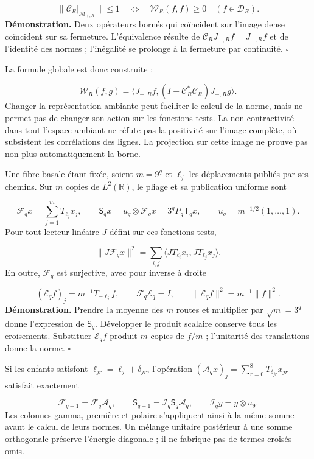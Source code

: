 \[
\|\mathcal C_R|_{\mathcal M_{+,R}}\|\leq1
\quad\Longleftrightarrow\quad
\mathscr W_R(f,f)\geq0\quad(f\in\mathcal D_R).
\]
\textbf{Démonstration.} Deux opérateurs bornés qui coïncident sur l’image dense coïncident sur sa fermeture. L’équivalence résulte de \(\mathcal C_RJ_{+,R}f=J_{-,R}f\) et de l’identité des normes ; l’inégalité se prolonge à la fermeture par continuité. \hfill\(\square\)

La formule globale est donc construite :

\[
\mathscr W_R(f,g)=
\langle J_{+,R}f,(I-\mathcal C_R^*\mathcal C_R)J_{+,R}g\rangle.
\]
Changer la représentation ambiante peut faciliter le calcul de la norme, mais ne permet pas de changer son action sur les fonctions tests. La non-contractivité dans tout l’espace ambiant ne réfute pas la positivité sur l’image complète, où subsistent les corrélations des lignes. La projection sur cette image ne prouve pas non plus automatiquement la borne.

Une fibre basale étant fixée, soient \(m=9^q\) et \(\ell_j\) les déplacements publiés par ses chemins. Sur \(m\) copies de \(L^2(\mathbb R)\), le pliage et sa publication uniforme sont

\[
\mathcal F_qx=\sum_{j=1}^mT_{\ell_j}x_j,\qquad
\mathsf S_qx=u_q\otimes\mathcal F_qx=3^qP_q\mathsf T_qx,
\qquad u_q=m^{-1/2}(1,\ldots,1).
\]
Pour tout lecteur linéaire \(J\) défini sur ces fonctions tests,

\[
\|J\mathcal F_qx\|^2
=\sum_{i,j}\langle JT_{\ell_i}x_i,JT_{\ell_j}x_j\rangle.
\]
En outre, \(\mathcal F_q\) est surjective, avec pour inverse à droite

\[
(\mathcal E_qf)_j=m^{-1}T_{-\ell_j}f,\qquad
\mathcal F_q\mathcal E_q=I,\qquad
\|\mathcal E_qf\|^2=m^{-1}\|f\|^2.
\]
\textbf{Démonstration.} Prendre la moyenne des \(m\) routes et multiplier par \(\sqrt m=3^q\) donne l’expression de \(\mathsf S_q\). Développer le produit scalaire conserve tous les croisements. Substituer \(\mathcal E_qf\) produit \(m\) copies de \(f/m\) ; l’unitarité des translations donne la norme. \hfill\(\square\)

Si les enfants satisfont \(\ell_{jr}=\ell_j+\delta_{jr}\), l'opération \((\mathcal A_qx)_j=\sum_{r=0}^8T_{\delta_{jr}}x_{jr}\) satisfait exactement

\[
\mathcal F_{q+1}=\mathcal F_q\mathcal A_q,\qquad
\mathsf S_{q+1}=\mathcal I_q\mathsf S_q\mathcal A_q,\qquad
\mathcal I_qy=y\otimes u_9.
\]
Les colonnes gamma, première et polaire s'appliquent ainsi à la même somme avant le calcul de leurs normes. Un mélange unitaire postérieur à une somme orthogonale préserve l'énergie diagonale ; il ne fabrique pas de termes croisés omis.

